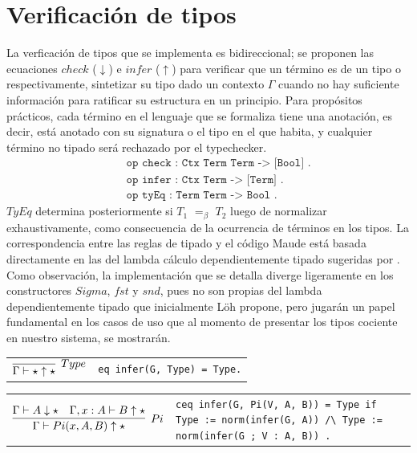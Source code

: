 \section{Verificación de tipos}
La verficación de tipos que se implementa es bidireccional; se proponen las ecuaciones $check$ ($\downarrow$) e $infer$ ($\uparrow$) para verificar que un término es de un tipo o respectivamente, sintetizar su tipo dado un contexto $\Gamma$ cuando no hay suficiente información para ratificar su estructura en un principio. Para propósitos prácticos, cada término en el lenguaje que se formaliza tiene una anotación, es decir, está anotado con su signatura o el tipo en el que habita, y cualquier término no tipado será rechazado por el typechecker.
\begin{align}
  & \quad \texttt{op check : Ctx Term Term -> [Bool] .} \\
  & \quad \texttt{op infer : Ctx Term -> [Term] .} \\
  & \quad \texttt{op tyEq : Term Term -> Bool .}
\end{align}
$TyEq$ determina posteriormente si $T_1$ $=_\beta$ $T_2$ luego de normalizar exhaustivamente, como consecuencia de la ocurrencia de términos en los tipos. La correspondencia entre las reglas de tipado y el código Maude está basada directamente en las del lambda cálculo dependientemente tipado sugeridas por \cite{loh2010}. Como observación, la implementación que se detalla diverge ligeramente en los constructores $Sigma$, $fst$ y $snd$, pues no son propias del lambda dependientemente tipado que inicialmente Löh propone, pero jugarán un papel fundamental en los casos de uso que al momento de presentar los tipos cociente en nuestro sistema, se mostrarán.

\begin{center}
\begin{tabular}{@{}c@{\qquad}p{7cm}@{}}
$\infer[Type]
  {\Gamma \vdash \star \uparrow \star }
  {}$
  &
  \texttt{eq infer(G, Type) = Type.}
\end{tabular}
\end{center}

\begin{center}
\begin{tabular}{@{}c@{\qquad}p{6cm}@{}}
$\infer[Pi]
  {\Gamma \vdash Pi(x, A, B) \uparrow \star}
  {\Gamma \vdash A \downarrow \star \quad \Gamma, x : A \vdash B \uparrow \star}$
  &
    \texttt{ceq infer(G, Pi(V, A, B)) = Type
    if Type := norm(infer(G, A)) 
    /\textbackslash{} Type := norm(infer(G ; V : A, B)) .}
\end{tabular}
\end{center}

